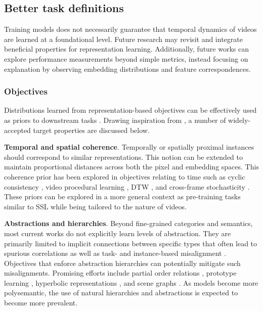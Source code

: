 \subsection{Better task definitions}
\label{sec:directions::tasks}

Training models does not necessarily guarantee that temporal dynamics of videos are learned at a foundational level. Future research may revisit and integrate beneficial properties for representation learning. Additionally, future works can explore performance measurements beyond simple metrics, instead focusing on explanation by observing embedding distributions and feature correspondences. 


\subsubsection{Objectives}
\label{sec:directions::tasks:::objectives}

Distributions learned from representation-based objectives can be effectively used as priors to downstream tasks . Drawing inspiration from , a number of widely-accepted target properties are discussed below.

\noindent
\textbf{Temporal and spatial coherence}. Temporally or spatially proximal instances should correspond to similar representations. This notion can be extended to maintain proportional distances across both the pixel and embedding spaces. This coherence prior has been explored in objectives relating to time such as cyclic consistency , video procedural learning , DTW , and cross-frame stochasticity . These priors can be explored in a more general context as pre-training tasks similar to SSL while being tailored to the nature of videos. 

\noindent
\textbf{Abstractions and hierarchies}. Beyond fine-grained categories and semantics, most current works do not explicitly learn levels of abstraction. They are primarily limited to implicit connections between specific types  that often lead to spurious correlations  as well as task- and instance-based misalignment . Objectives that enforce abstraction hierarchies can potentially mitigate such misalignments. Promising efforts include partial order relations , prototype learning , hyperbolic representations , and scene graphs . As models become more polysemantic, the use of natural hierarchies and abstractions is expected to become more prevalent.

